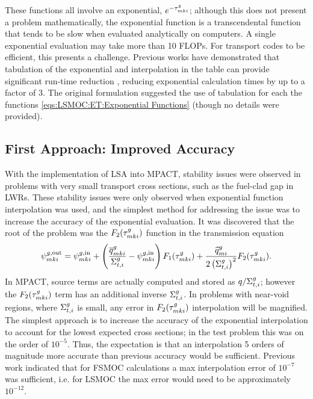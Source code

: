 {{    These functions all involve an exponential, $e^{-\segopt}$; although this does not present a problem mathematically, the exponential function is a transcendental function that tends to be slow when evaluated analytically on computers.
    A single exponential evaluation may take more than 10 \acp{FLOP}.
    For transport codes to be efficient, this presents a challenge.
    Previous works have demonstrated that tabulation of the exponential and interpolation in the table can provide significant run-time reduction \cite{Yamamoto2004}, reducing exponential calculation times by up to a factor of 3.
    The original formulation \cite{Ferrer2016} suggested the use of tabulation for each the functions \cref{eqs:LSMOC:ET:Exponential Functions} (though no details were provided).

    \subsection{First Approach: Improved Accuracy}{\label{ssec:LSMOC:ET:First Approach: Improved Accuracy}
      With the implementation of \ac{LSA} into MPACT, stability issues were observed in problems with very small transport cross sections, such as the fuel-clad gap in \acp{LWR}.
      These stability issues were only observed when exponential function interpolation was used, and the simplest method for addressing the issue was to increase the accuracy of the exponential evaluation.
      It was discovered that the root of the problem was the $F_2(\segopt)$ function in the transmission equation
      \begin{equation}\label{eq:LSMOC:ET:Transmission Original}
        \afluxout = \afluxin
                  + \left(\frac{\tsrcF}{\xst}-\afluxin\right)F_1(\segopt)
                  + \frac{\tsrcL}{2\left(\xst\right)^2}F_2(\segopt).
      \end{equation}
      In MPACT, source terms are actually computed and stored as $q/\xst$; however the $F_2(\segopt)$ term has an additional inverse $\xst$.
      In problems with near-void regions, where $\xst$ is small, any error in $F_2(\segopt)$ interpolation will be magnified.
      The simplest approach is to increase the accuracy of the exponential interpolation to account for the lowest expected cross sections; in the test problem this was on the order of $10^{-5}$.
      Thus, the expectation is that an interpolation 5 orders of magnitude more accurate than previous accuracy would be sufficient.
      Previous work \cite{Yamamoto2004} indicated that for \ac{FSMOC} calculations a max interpolation error of $10^{-7}$ was sufficient, i.e. for \ac{LSMOC} the max error would need to be approximately $10^{-12}$.

}}}
